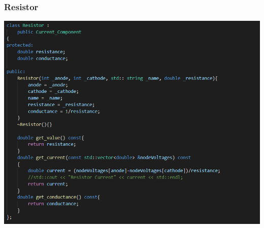 \documentclass{article}
\begin{document}
\subsubsection{Resistor}
\includegraphics[width=15cm]{images/Resistor.PNG}
\end{document}
